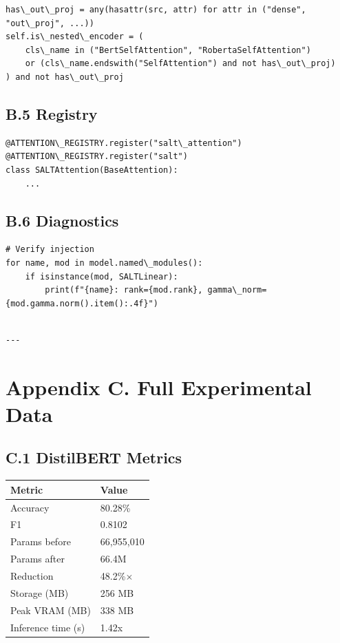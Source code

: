 \begin{lstlisting}
has\_out\_proj = any(hasattr(src, attr) for attr in ("dense", "out\_proj", ...))
self.is\_nested\_encoder = (
    cls\_name in ("BertSelfAttention", "RobertaSelfAttention")
    or (cls\_name.endswith("SelfAttention") and not has\_out\_proj)
) and not has\_out\_proj
\end{lstlisting}

\subsection{B.5 Registry}

\begin{lstlisting}
@ATTENTION\_REGISTRY.register("salt\_attention")
@ATTENTION\_REGISTRY.register("salt")
class SALTAttention(BaseAttention):
    ...
\end{lstlisting}

\subsection{B.6 Diagnostics}

\begin{lstlisting}
# Verify injection
for name, mod in model.named\_modules():
    if isinstance(mod, SALTLinear):
        print(f"{name}: rank={mod.rank}, gamma\_norm={mod.gamma.norm().item():.4f}")
\end{lstlisting}
\begin{lstlisting}

---
\end{lstlisting}


\section{Appendix C. Full Experimental Data}

\subsection{C.1 DistilBERT Metrics}

\begin{table}[H]
\centering
\small
\begin{tabular}{ll}
\toprule
\textbf{Metric} & \textbf{Value} \\
\midrule
Accuracy & 80.28\% \\
F1 & 0.8102 \\
Params before & 66,955,010 \\
Params after & 66.4M \\
Reduction & 48.2\%$\times$ \\
Storage (MB) & 256 MB \\
Peak VRAM (MB) & 338 MB \\
Inference time (s) & 1.42x \\
\bottomrule
\end{tabular}
\end{table}

